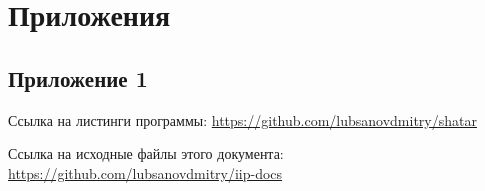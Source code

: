 {
	\chapter*{Приложения}
	\section*{Приложение 1}
	Ссылка на листинги программы: \href{https://github.com/lubsanovdmitry/shatar}{https://github.com/lubsanovdmitry/shatar}
	
	Ссылка на исходные файлы этого документа:\\ \href{https://github.com/lubsanovdmitry/iip-docs}{https://github.com/lubsanovdmitry/iip-docs}
	\clearpage
}